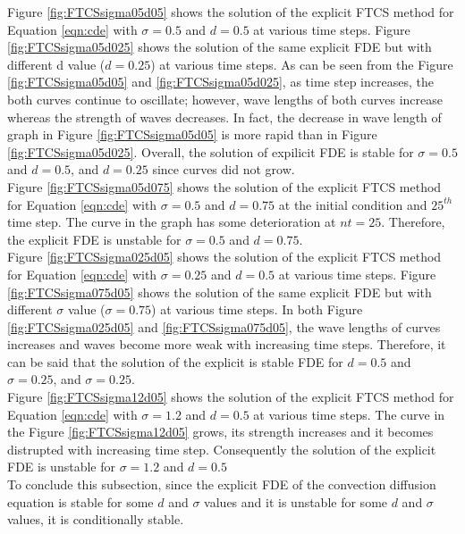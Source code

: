 \documentclass[letterpaper,12pt]{article}
\begin{document}
Figure \ref{fig:FTCSsigma05d05} shows the solution of the explicit FTCS
method for Equation \ref{eqn:cde} with $\sigma= 0.5$ and $d=0.5$ at various time steps.
Figure \ref{fig:FTCSsigma05d025} shows the solution of the same explicit FDE but with 
different d value ($d=0.25$) at various time steps. As can be seen from the Figure \ref{fig:FTCSsigma05d05}
and \ref{fig:FTCSsigma05d025}, as time step increases, the both curves continue to oscillate; however, wave lengths
of both curves increase whereas the strength of waves decreases. In fact, the decrease in wave length of graph 
in Figure \ref{fig:FTCSsigma05d05} is more rapid than in Figure \ref{fig:FTCSsigma05d025}.
Overall, the solution of expilicit FDE is stable for $\sigma= 0.5$ and $d=0.5$, and $d=0.25$ since 
curves did not grow. \\
\indent Figure \ref{fig:FTCSsigma05d075} shows the solution of the explicit FTCS
method for Equation \ref{eqn:cde} with $\sigma= 0.5$ and $d=0.75$ at the initial condition
and $25^{th}$ time step. The curve in the graph has some deterioration at $nt = 25$. Therefore,
the explicit FDE is unstable for $\sigma= 0.5$ and $d=0.75$.\\
\indent Figure \ref{fig:FTCSsigma025d05} shows the solution of the explicit FTCS
method for Equation \ref{eqn:cde} with $\sigma= 0.25$ and $d=0.5$ at various time steps.
Figure \ref{fig:FTCSsigma075d05} shows the solution of the same explicit FDE but with 
different $\sigma$ value ($\sigma=0.75$) at various time steps. In both Figure \ref{fig:FTCSsigma025d05}
and \ref{fig:FTCSsigma075d05}, the wave lengths of curves increases and waves become more weak 
with increasing time steps. Therefore, it can be said that the solution of the explicit is stable 
FDE for $d=0.5$ and $\sigma = 0.25$, and $\sigma = 0.25$.\\
\indent Figure \ref{fig:FTCSsigma12d05} shows the solution of the explicit FTCS
method for Equation \ref{eqn:cde} with $\sigma= 1.2$ and $d=0.5$ at various time steps. The curve in the
Figure \ref{fig:FTCSsigma12d05} grows, its strength increases and it becomes distrupted with 
increasing time step. Consequently the solution of the explicit FDE is unstable for $\sigma=1.2$ and $d=0.5$\\
\indent To conclude this subsection, since the explicit FDE of the convection diffusion equation is stable for some $d$ 
and $\sigma$ values and it is unstable for some $d$ and $\sigma$ values, it is conditionally stable.
\newpage
\end{document}
